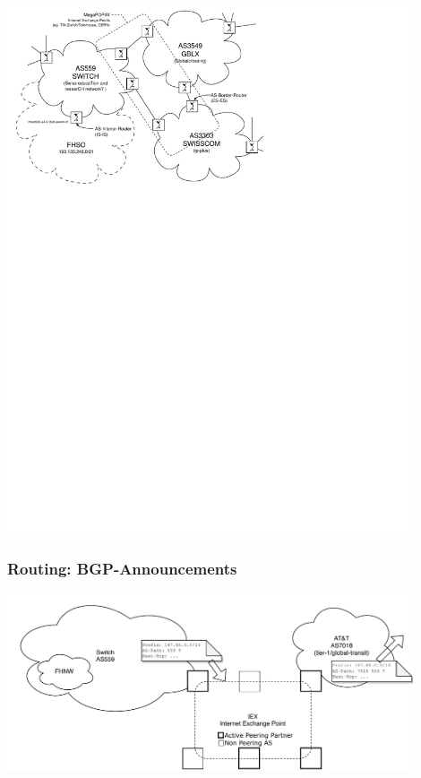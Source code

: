\documentclass[ignorenonframetext]{beamer}
\begin{document}
\begin{frame}
\begin{minipage}[t]{8cm}
\begin{center}
		\includegraphics[width=12cm]{routing-as}
	\end{center}
\end{minipage}
\end{frame}



\begin{frame}
\frametitle{Routing: BGP-Announcements}
\begin{center}
	\includegraphics[width=12cm]{routing-bgp-updates}
\end{center}
\end{frame}
\end{document}
